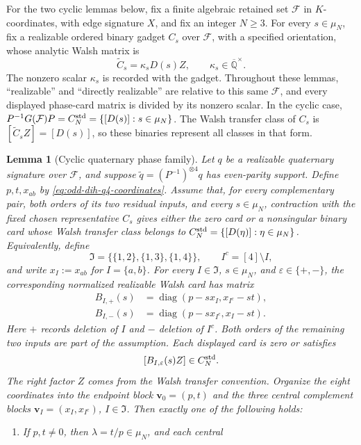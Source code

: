 \documentclass[11pt,letterpaper,onecolumn]{article}
\theoremstyle{plain}
\newtheorem{lemma}[lemma]{Lemma}
\theoremstyle{definition}
\theoremstyle{remark}
\newcommand{\AlgNums}{\overline{\mathbb Q}}
\newcommand{\cF}{\mathcal F}
\newcommand{\diag}{\operatorname{diag}}
\begin{document}
For the two cyclic lemmas below, fix a finite algebraic retained set \(\cF\) in \(K\)-coordinates, with edge signature \(X\), and
fix an integer \(N\ge3\).  For every \(s\in\mu_N\), fix a realizable ordered binary gadget
\(C_s\) over \(\cF\), with a specified orientation, whose analytic Walsh
matrix is
\[
  \widetilde C_s=\kappa_sD(s)Z,
  \qquad \kappa_s\in\AlgNums^\times.
\]
The nonzero scalar \(\kappa_s\) is recorded with the gadget.  Throughout
these lemmas, ``realizable'' and ``directly realizable'' are relative to this same
\(\cF\), and every displayed phase-card matrix is divided by its nonzero scalar. In the cyclic case,
\(P^{-1}G(\cF)P=C_N^{\rm std}=\{[D(s)]:s\in\mu_N\}\). The Walsh transfer class of \(C_s\)
is \([\widetilde C_sZ]=[D(s)]\), so these binaries represent all classes
in that form.

\begin{lemma}[Cyclic quaternary phase family]
\label{lem:odd-cyc-q4-family}
Let \(q\) be a realizable quaternary signature over \(\cF\), and suppose
\(\widetilde q=(P^{-1})^{\otimes4}q\) has even-parity support.  Define \(p,t,x_{ab}\) by \cref{eq:odd-dih-q4-coordinates}.  Assume
that, for every complementary pair, both orders of its two residual inputs,
and every \(s\in\mu_N\), contraction with the fixed chosen representative
\(C_s\) gives either the zero card or a nonsingular binary card whose Walsh
transfer class belongs to
\(C_N^{\rm std}=\{[D(\eta)]:\eta\in\mu_N\}\).  Equivalently, define
\[
  \mathfrak I=\bigl\{\{1,2\},\{1,3\},\{1,4\}\bigr\},
  \qquad I^c=[4]\setminus I,
\]
and write \(x_I:=x_{ab}\) for \(I=\{a,b\}\).  For every
\(I\in\mathfrak I\), \(s\in\mu_N\), and
\(\varepsilon\in\{+,-\}\), the corresponding normalized realizable Walsh card
has matrix
\begin{align*}
 B_{I,+}(s)&=\diag(p-sx_I,x_{I^c}-st),\\
 B_{I,-}(s)&=\diag(p-sx_{I^c},x_I-st).
\end{align*}
Here \(+\) records deletion of \(I\) and \(-\) deletion of \(I^c\). Both
orders of the remaining two inputs are part of the assumption.  Each displayed
card is zero or satisfies
\[
  [B_{I,\varepsilon}(s)Z]\in C_N^{\rm std}.
\]
The right factor \(Z\) comes from the Walsh transfer convention.  Organize the eight coordinates into the endpoint block
\(\mathbf v_0=(p,t)\) and the three central complement blocks
\(\mathbf v_I=(x_I,x_{I^c})\), \(I\in\mathfrak I\).  Then exactly one of the
following holds:
\begin{enumerate}
\item If \(p,t\ne0\), then \(\lambda=t/p\in\mu_N\), and each central

\end{enumerate}
\end{lemma}
\end{document}
